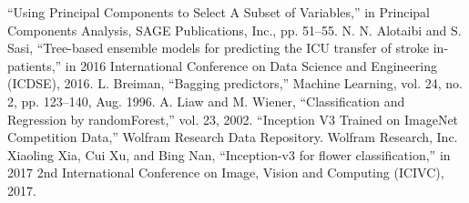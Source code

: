 \documentclass[conference,table]{IEEEtran}
\begin{document}
\begin{thebibliography}{00}
		 ``Using Principal Components to Select A Subset of Variables,'' in Principal Components Analysis, SAGE Publications, Inc., pp. 51–55.
		 N. N. Alotaibi and S. Sasi, ``Tree-based ensemble models for predicting the ICU transfer of stroke in-patients,'' in 2016 International Conference on Data Science and Engineering (ICDSE), 2016.
		 L. Breiman, ``Bagging predictors,'' Machine Learning, vol. 24, no. 2, pp. 123–140, Aug. 1996.
		 A. Liaw and M. Wiener, ``Classification and Regression by randomForest,'' vol. 23, 2002.
		 ``Inception V3 Trained on ImageNet Competition Data,'' Wolfram Research Data Repository. Wolfram Research, Inc.
		 Xiaoling Xia, Cui Xu, and Bing Nan, ``Inception-v3 for flower classification,'' in 2017 2nd International Conference on Image, Vision and Computing (ICIVC), 2017.
	\end{thebibliography}
\end{document}
